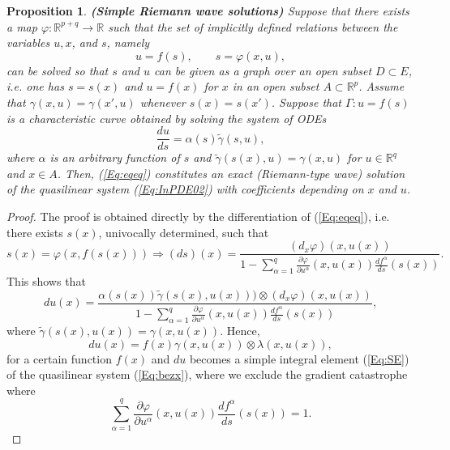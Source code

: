 \documentclass{birkjour}
\newtheorem{prop}[thm]{Proposition}
\theoremstyle{definition}
\theoremstyle{remark}
\numberwithin{equation}{section}
\numberwithin{equation}{section}
\numberwithin{thm}{section}
\numberwithin{equation}{section}
\numberwithin{thm}{section}
\begin{document}
\begin{prop} {\bf (Simple Riemann wave solutions)} Suppose that there exists a map $\varphi:\mathbb{R}^{p+q}\rightarrow \mathbb{R}$ such that the set of implicitly defined relations between the variables $u,x$, and $s$, namely
	\begin{equation}\label{Eq:eqeq}
		u=f(s),\qquad s=\varphi(x,u),
	\end{equation}
	can be solved so that $s$ and $u$ can be given as a graph over an open subset $D\subset E$, i.e. one has $s=s(x)$ and $u=f(x)$ for $x$ in an open subset $A\subset \mathbb{R}^p$. Assume that $\gamma(x,u)=\gamma(x',u)$ whenever    $s(x)=s(x')$. 
	Suppose that $\Gamma:u=f(s)$ is a characteristic curve obtained by solving the system of ODEs 
	$$
	\frac{du}{ds}=\alpha(s)\widetilde{\gamma}(s,u),
	$$
	where $\alpha$ is an arbitrary function of $s$ and $\widetilde{\gamma}(s(x),u)=\gamma(x,u)$ for $u\in \mathbb{R}^q$ and $x\in A$.  Then, (\ref{Eq:eqeq}) constitutes an exact (Riemann-type wave) solution of the quasilinear system (\ref{Eq:InPDE02}) with coefficients depending on $x$ and $u$.
\end{prop}
\begin{proof}
	The proof is obtained directly by the differentiation of (\ref{Eq:eqeq}), i.e. there exists $s(x)$, univocally determined, such that 
	$$
	s(x)=\varphi(x,f(s(x)))\Rightarrow  (ds)(x)=\frac{(d_x\varphi)(x,u(x))}{1-\sum_{\alpha=1}^q\frac{\partial\varphi}{\partial u^\alpha}(x,u(x))\frac{df^\alpha}{ds}(s(x))}.
	$$
	This shows that
	\begin{equation}\label{Eq:Cat}
		du(x)=\frac{\alpha(s(x))\widetilde{\gamma}(s(x),u(x)))\otimes (d_x\varphi)(x,u(x))}{1-\sum_{\alpha=1}^q\frac{\partial\varphi}{\partial u^\alpha}(x,u(x))\frac{df^\alpha}{ds}(s(x))},
	\end{equation}
	where $\widetilde{\gamma}(s(x),u(x))=\gamma(x,u(x))$.
	Hence,
	\begin{equation}\label{Eq:SE}
		du(x)=f(x)\gamma(x,u(x))\otimes \lambda(x,u(x)),
	\end{equation}
	for a certain function $f(x)$ and $du$
	becomes a simple integral element (\ref{Eq:SE}) of the quasilinear system (\ref{Eq:bezx}), where we exclude the gradient catastrophe where 
	$$
	\sum_{\alpha=1}^q\frac{\partial\varphi}{\partial u^\alpha}(x,u(x))\frac{df^\alpha}{ds}(s(x))=1.
	$$
\end{proof}
\end{document}
